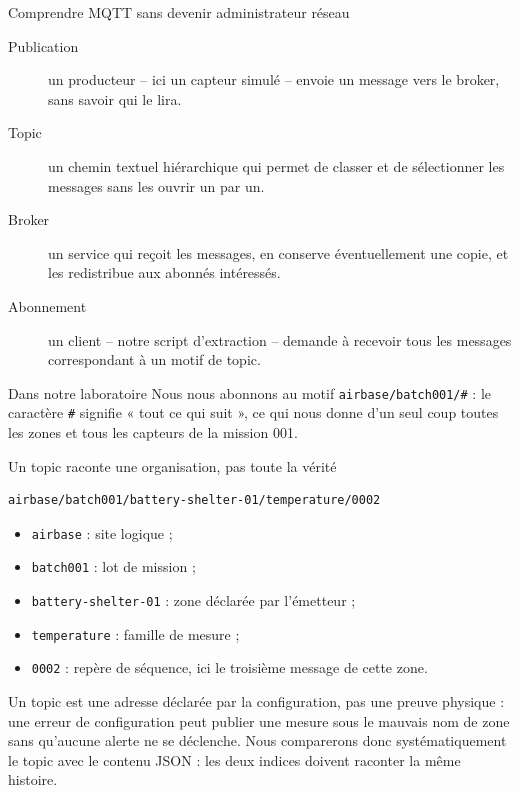 \documentclass[aspectratio=169]{beamer}
\begin{document}
\begin{frame}{Comprendre MQTT sans devenir administrateur réseau}
  \begin{description}
    \item[Publication] un producteur -- ici un capteur simulé -- envoie un message vers le broker, sans savoir qui le lira.
    \item[Topic] un chemin textuel hiérarchique qui permet de classer et de sélectionner les messages sans les ouvrir un par un.
    \item[Broker] un service qui reçoit les messages, en conserve éventuellement une copie, et les redistribue aux abonnés intéressés.
    \item[Abonnement] un client -- notre script d'extraction -- demande à recevoir tous les messages correspondant à un motif de topic.
  \end{description}
  \begin{block}{Dans notre laboratoire}
    Nous nous abonnons au motif \texttt{airbase/batch001/\#} : le caractère \texttt{\#} signifie « tout ce qui suit », ce qui nous donne d'un seul coup toutes les zones et tous les capteurs de la mission 001.
  \end{block}
\end{frame}

\begin{frame}[fragile]{Un topic raconte une organisation, pas toute la vérité}
  \small
  \begin{verbatim}
airbase/batch001/battery-shelter-01/temperature/0002
  \end{verbatim}
  \begin{itemize}
    \item \texttt{airbase} : site logique ;
    \item \texttt{batch001} : lot de mission ;
    \item \texttt{battery-shelter-01} : zone déclarée par l'émetteur ;
    \item \texttt{temperature} : famille de mesure ;
    \item \texttt{0002} : repère de séquence, ici le troisième message de cette zone.
  \end{itemize}
  \alert{Un topic est une adresse déclarée par la configuration, pas une preuve physique : une erreur de configuration peut publier une mesure sous le mauvais nom de zone sans qu'aucune alerte ne se déclenche. Nous comparerons donc systématiquement le topic avec le contenu JSON : les deux indices doivent raconter la même histoire.}
\end{frame}
\end{document}
